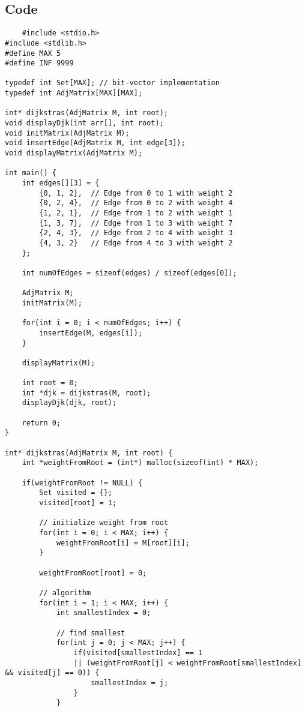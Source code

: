 \documentclass{book}
\begin{document}
\subsection{Code}
\begin{verbatim}
    #include <stdio.h>
#include <stdlib.h>
#define MAX 5
#define INF 9999

typedef int Set[MAX]; // bit-vector implementation
typedef int AdjMatrix[MAX][MAX];

int* dijkstras(AdjMatrix M, int root);
void displayDjk(int arr[], int root);
void initMatrix(AdjMatrix M);
void insertEdge(AdjMatrix M, int edge[3]);
void displayMatrix(AdjMatrix M);

int main() {
    int edges[][3] = {
        {0, 1, 2},  // Edge from 0 to 1 with weight 2
        {0, 2, 4},  // Edge from 0 to 2 with weight 4
        {1, 2, 1},  // Edge from 1 to 2 with weight 1
        {1, 3, 7},  // Edge from 1 to 3 with weight 7
        {2, 4, 3},  // Edge from 2 to 4 with weight 3
        {4, 3, 2}   // Edge from 4 to 3 with weight 2
    };

    int numOfEdges = sizeof(edges) / sizeof(edges[0]);
    
    AdjMatrix M;
    initMatrix(M);

    for(int i = 0; i < numOfEdges; i++) {
        insertEdge(M, edges[i]);
    }

    displayMatrix(M);

    int root = 0;
    int *djk = dijkstras(M, root);
    displayDjk(djk, root);

    return 0;
}

int* dijkstras(AdjMatrix M, int root) {
    int *weightFromRoot = (int*) malloc(sizeof(int) * MAX);
    
    if(weightFromRoot != NULL) {
        Set visited = {};
        visited[root] = 1; 

        // initialize weight from root
        for(int i = 0; i < MAX; i++) {
            weightFromRoot[i] = M[root][i];
        }

        weightFromRoot[root] = 0;

        // algorithm
        for(int i = 1; i < MAX; i++) {
            int smallestIndex = 0;

            // find smallest
            for(int j = 0; j < MAX; j++) {
                if(visited[smallestIndex] == 1
                || (weightFromRoot[j] < weightFromRoot[smallestIndex] && visited[j] == 0)) {
                    smallestIndex = j;
                }
            }


\end{verbatim}
\end{document}
